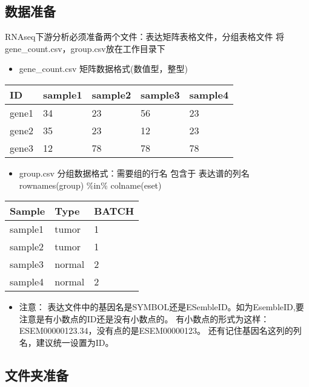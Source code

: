 \documentclass[
]{book}
\providecommand{\tightlist}{%
  \setlength{\itemsep}{0pt}\setlength{\parskip}{0pt}}
\begin{document}
\subsection{数据准备}\label{ux6570ux636eux51c6ux5907}

RNAseq下游分析必须准备两个文件：表达矩阵表格文件，分组表格文件
将gene\_count.csv，group.csv放在工作目录下

\begin{itemize}
\tightlist
\item
  gene\_count.csv 矩阵数据格式(数值型，整型)
\end{itemize}

\begin{longtable}[]{@{}lllll@{}}
\toprule\noalign{}
ID & sample1 & sample2 & sample3 & sample4 \\
\midrule\noalign{}
\endhead
\bottomrule\noalign{}
\endlastfoot
gene1 & 34 & 23 & 56 & 23 \\
gene2 & 35 & 23 & 12 & 23 \\
gene3 & 12 & 78 & 78 & 78 \\
\end{longtable}

\begin{itemize}
\tightlist
\item
  group.csv 分组数据格式：需要组的行名 包含于 表达谱的列名 rownames(group) \%in\% colname(eset)
\end{itemize}

\begin{longtable}[]{@{}lll@{}}
\toprule\noalign{}
Sample & Type & BATCH \\
\midrule\noalign{}
\endhead
\bottomrule\noalign{}
\endlastfoot
sample1 & tumor & 1 \\
sample2 & tumor & 1 \\
sample3 & normal & 2 \\
sample4 & normal & 2 \\
\end{longtable}

\begin{itemize}
\tightlist
\item
  注意：
  表达文件中的基因名是SYMBOL还是ESembleID。如为EsembleID,要注意是有小数点的ID还是没有小数点的。
  有小数点的形式为这样：ESEM00000123.34，没有点的是ESEM00000123。
  还有记住基因名这列的列名，建议统一设置为ID。
\end{itemize}

\subsection{文件夹准备}\label{ux6587ux4ef6ux5939ux51c6ux5907}
\end{document}
